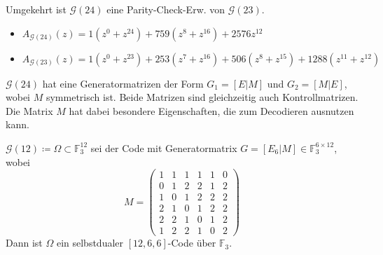 \documentclass{cheat-sheet}
\newcommand{\F}{\mathbb{F}} %
\DeclareMathOperator{\wt}{wt} %
\newcommand{\Golay}{\mathcal{G}} %
\begin{document}
\begin{bem}
  Umgekehrt ist $\Golay(24)$ eine Parity-Check-Erw. von $\Golay(23)$.
\end{bem}

\begin{satz}
  \begin{itemize}
    \item $A_{\Golay(24)}(z) = 1 (z^0 + z^{24}) + 759 (z^8 + z^{16}) + 2576 z^{12}$
    \item $A_{\Golay(23)}(z) = 1 (z^0 \!+\! z^{23}) + 253 (z^7 \!+\! z^{16}) + 506 (z^8 \!+\! z^{15}) + 1288 (z^{11} \!+\! z^{12})$
  \end{itemize}
\end{satz}

\begin{bem}
  $\Golay(24)$ hat eine Generatormatrizen der Form $G_1 = [E|M]$ und $G_2 = [M|E]$, wobei $M$ symmetrisch ist.
  Beide Matrizen sind gleichzeitig auch Kontrollmatrizen.
  Die Matrix $M$ hat dabei besondere Eigenschaften, die zum Decodieren ausnutzen kann.
\end{bem}

\iffalse
  Decodierung: Schreibe $x \in \F_2^{24}$ als $x_1 | x_2$ mit $x_1, x_2 \in \F_2^{12}$.
  Berechne Syndome $S_1 = G_1 y = G_1 e = e_1 + M e_2$ und $S_2 = G_2 y = M e_1 + e_2$.
  Es gilt:
  \begin{itemize}
    \item $\wt(S_1) \leq 3 \iff e_2 = 0 \implies S_1 = e_1 \implies e = e_1 | 0 = S_1 | 0$
    \item $\wt(S_2) \leq 3 \implies e_1 = 0 \implies S_2 = e_2 \implies e = 0 | S_2$
  \end{itemize}
  $\wt(S_1), \wt(S_2) \geq 4$.
  Berechne $S_i = G_2 \cdot (y + (\epsilon_i|0)) = m(e_1 + \epsilon_i) + e_2$
  Beachte: $(\wt(e_1), \wt(e_2)) \in \{ (1,2), (1,1), (2,1) \}$
  $\wt(e_1) = 2 \iff \wt(S_i) \geq 4$ für alle $i = 1, \ldots, 12$
  $\wt(e_1) = 1 \iff$ es gibt genau ein $l$ mit $\wt(s_l) \leq 2$ nämlich das $l$ wodurch $e_1 = \epsilon_l$
\fi


\begin{satz}
  $\Golay(12) \coloneqq \Omega \subset \F_3^{12}$ sei der Code mit Generatormatrix $G=[E_6|M] \in \F_3^{6 \times 12}$, wobei
  \[
    M = \begin{pmatrix}
      1 & 1 & 1 & 1 & 1 & 0 \\
      0 & 1 & 2 & 2 & 1 & 2 \\
      1 & 0 & 1 & 2 & 2 & 2 \\
      2 & 1 & 0 & 1 & 2 & 2 \\
      2 & 2 & 1 & 0 & 1 & 2 \\
      1 & 2 & 2 & 1 & 0 & 2
    \end{pmatrix}
  \]
  Dann ist $\Omega$ ein selbstdualer $[12, 6, 6]$-Code über $\F_3$.
\end{satz}
\end{document}

